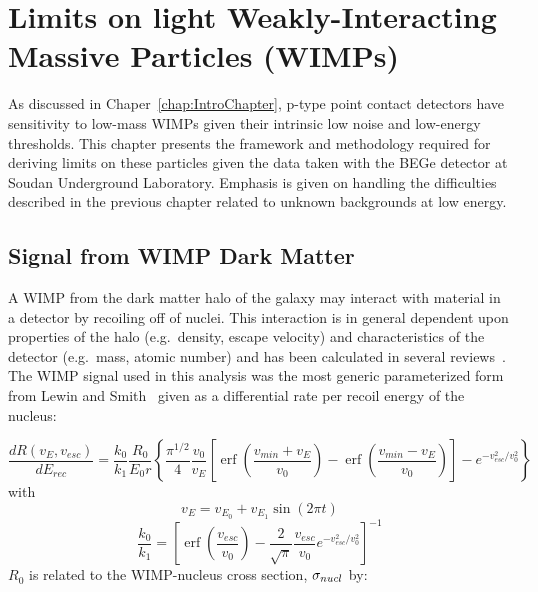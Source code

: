 
\chapter{Limits on light Weakly-Interacting Massive Particles (WIMPs)}
\label{chap:DMWIMPLimits}

	As discussed in Chaper~\ref{chap:IntroChapter}, p-type point contact detectors have sensitivity to low-mass WIMPs given their intrinsic low noise and low-energy thresholds.  This chapter presents the framework and methodology required for deriving limits on these particles given the data taken with the BEGe detector at Soudan Underground Laboratory.  Emphasis is given on handling the difficulties described in the previous chapter related to unknown backgrounds at low energy.  

	\section{Signal from WIMP Dark Matter}
	\label{sec:CalcLimitsOnWIMPSignal}	

	A WIMP from the dark matter halo of the galaxy may interact with material in a detector by recoiling off of nuclei.  This interaction is in general dependent upon properties of the halo (e.g.~density, escape velocity) and characteristics of the detector (e.g.~mass, atomic number) and has been calculated in several reviews~\cite{Lew96,Jun96}.  The WIMP signal used in this analysis was the most generic parameterized form from Lewin and Smith~\cite{Lew96} given as a differential rate per recoil energy of the nucleus:

		\begin{equation}
			\frac{dR (v_{E}, v_{esc})}{dE_{rec}} = 
				\frac{k_{0}}{k_{1}} \frac{R_{0}}{E_{0} r} 
				\left\{ 
			 		\frac{\pi^{1/2}}{4} \frac{v_{0}}{v_{E}} 
					\left[ 
						\operatorname{erf} \left( \frac{v_{min} + v_{E}}{v_{0}} \right) - 
							   \operatorname{erf} \left( \frac{v_{min} - v_{E}}{v_{0}} \right) 
					\right] 
					- e^{-v_{esc}^{2}/v_{0}^{2}} 
				\right\}
			\label{eqn:WIMPMasterEqn}
		\end{equation}
with 
		\[
		v_{E} = v_{E_{0}} + v_{E_{1}}\sin (2 \pi t)
		\]
		\[
		\frac{k_{0}}{k_{1}} = \left[
			\operatorname{erf} \left( \frac{v_{esc}}{v_{0}} \right ) - 
			\frac{2}{\sqrt{\pi}} \frac{v_{esc}}{v_{0}} e^{-v_{esc}^{2}/v_{0}^{2}}
		\right]^{-1}
		\]
$R_{0}$ is related to the WIMP-nucleus cross section, $\sigma_{nucl}$ by:

